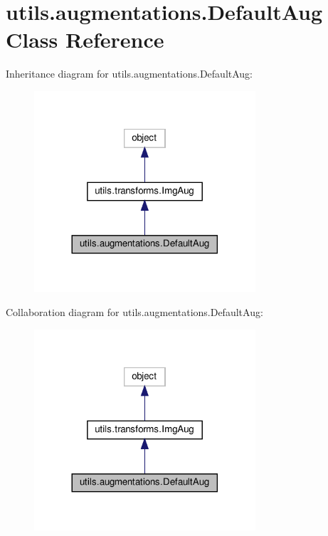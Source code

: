 \hypertarget{classutils_1_1augmentations_1_1DefaultAug}{}\section{utils.\+augmentations.\+Default\+Aug Class Reference}
\label{classutils_1_1augmentations_1_1DefaultAug}


Inheritance diagram for utils.\+augmentations.\+Default\+Aug\+:
\nopagebreak
\begin{figure}[H]
\begin{center}
\leavevmode
\includegraphics[width=233pt]{classutils_1_1augmentations_1_1DefaultAug__inherit__graph}
\end{center}
\end{figure}


Collaboration diagram for utils.\+augmentations.\+Default\+Aug\+:
\nopagebreak
\begin{figure}[H]
\begin{center}
\leavevmode
\includegraphics[width=233pt]{classutils_1_1augmentations_1_1DefaultAug__coll__graph}
\end{center}
\end{figure}
